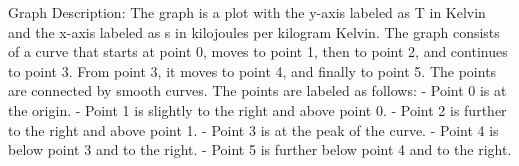 Graph Description: The graph is a plot with the y-axis labeled as T in Kelvin and the x-axis labeled as s in kilojoules per kilogram Kelvin. The graph consists of a curve that starts at point 0, moves to point 1, then to point 2, and continues to point 3. From point 3, it moves to point 4, and finally to point 5. The points are connected by smooth curves. The points are labeled as follows:
- Point 0 is at the origin.
- Point 1 is slightly to the right and above point 0.
- Point 2 is further to the right and above point 1.
- Point 3 is at the peak of the curve.
- Point 4 is below point 3 and to the right.
- Point 5 is further below point 4 and to the right.